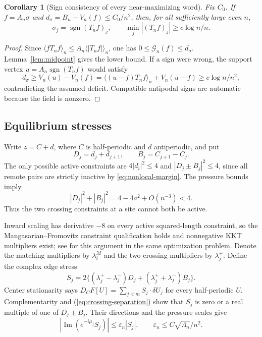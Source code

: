 \documentclass[11pt,reqno]{amsart}
\numberwithin{equation}{section}
\newtheorem{corollary}[theorem]{Corollary}
\theoremstyle{definition}
\theoremstyle{remark}
\newcommand{\av}[1]{\langle #1\rangle_n}
\DeclareMathOperator{\sgn}{sgn}
\newcommand{\Ima}{\operatorname{Im}}
\begin{document}
\begin{corollary}[Sign consistency of every near-maximizing word]\label{cor:sign-consistency}
Fix $C_0$. If $f=A_n\sigma$ and $d_\sigma=B_n-V_n(f)\le C_0/n^2$, then, for all sufficiently large even $n$,
\begin{equation}\label{eq:sign-consistency}
 \sigma_j=\sgn(T_nf)_j,\qquad \min_j|(T_nf)_j|\ge c\log n/n.
\end{equation}
\end{corollary}
\begin{proof}
Since $\av{fT_nf}\le A_n\av{|T_nf|}$, one has $0\le\mathscr G_n(f)\le d_\sigma$. Lemma~\ref{lem:midpoint} gives the lower bound. If a sign were wrong, the support vertex $u=A_n\sgn(T_nf)$ would satisfy
\[
 d_\sigma\ge V_n(u)-V_n(f)
 =\av{(u-f)T_nf}+V_n(u-f)\ge c\log n/n^2,
\]
contradicting the assumed deficit. Compatible antipodal signs are automatic because the field is nonzero.
\end{proof}

\subsection{Equilibrium stresses}
Write $z=C+d$, where $C$ is half-periodic and $d$ antiperiodic, and put
\[
 D_j=d_j+d_{j+1},\qquad B_j=C_{j+1}-C_j.
\]
The only possible active constraints are $4|d_i|^2\le4$ and $|D_j\pm B_j|^2\le4$, since all remote pairs are strictly inactive by \eqref{eq:nonlocal-margin}. The pressure bounds imply
\begin{equation}\label{eq:crossing-separation}
 |D_j|^2+|B_j|^2=4-4a^2+O(n^{-3})<4.
\end{equation}
Thus the two crossing constraints at a site cannot both be active.

Inward scaling has derivative $-8$ on every active squared-length constraint, so the Mangasarian--Fromovitz constraint qualification holds and nonnegative KKT multipliers exist; see \cite[Theorem~12]{cambie} for this argument in the same optimization problem. Denote the matching multipliers by $\lambda_i^M$ and the two crossing multipliers by $\lambda_j^\pm$. Define the complex edge stress
\begin{equation}\label{eq:edge-stress}
 S_j=2\{(\lambda_j^+-\lambda_j^-)D_j+(\lambda_j^++\lambda_j^-)B_j\}.
\end{equation}
Center stationarity says $D_CF[U]=\sum_{j<m}S_j\cdot\delta U_j$ for every half-periodic $U$. Complementarity and (\ref{eq:crossing-separation}) show that $S_j$ is zero or a real multiple of one of $D_j\pm B_j$. Their directions and the pressure scales give
\begin{equation}\label{eq:stress-tangential}
 |\Ima(e^{-i\mu_j}S_j)|\le\varepsilon_n|S_j|,
 \qquad \varepsilon_n\le C\sqrt{\Lambda_n}/n^2.
\end{equation}
\end{document}
